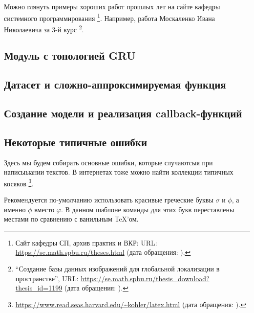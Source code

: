 Можно глянуть примеры хороших работ прошлых лет на сайте кафедры системного программирования%
\footnote{Сайт кафедры СП, архив практик и ВКР: URL: \url{https://se.math.spbu.ru/theses.html} (дата обращения: ).}.
Например, работа Москаленко Ивана Николаевича за 3-й курс%
\footnote{\enquote{Создание базы данных изображений для глобальной локализации в пространстве}, URL: \url{https://se.math.spbu.ru/thesis_download?thesis_id=1199} (дата обращения: ).}.

\subsection{Модуль с топологией GRU}
\label{subsec:task1}

\subsection{Датасет и сложно-аппроксимируемая функция}
\label{subsec:task2}

\subsection{Создание модели и реализация callback-функций}
\label{subsec:task3}

\subsection{Некоторые типичные ошибки}
Здесь мы будем собирать основные ошибки, которые случаютсыя при написыыании текстов.
В интернетах тоже можно найти коллекции типич\-ных косяков%
\footnote{\href{https://www.read.seas.harvard.edu/~kohler/latex.html}{https://www.read.seas.harvard.edu/\textasciitilde kohler/latex.html} (дата обращения: ).}.

Рекомендуется по-умол\-ча\-нию использовать красивые греческие бук\-вы $\sigma$  и $\phi$, а именно $\phi$ вместо $\varphi$.
В данном шаблоне команды для этих букв переставлены местами по сравнению с ванильным \TeX'ом.

